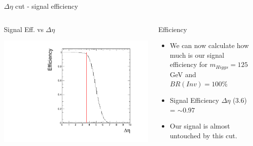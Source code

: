 \documentclass[8pt]{beamer}
\begin{document}
\begin{frame}{$\Delta\eta$ cut - signal efficiency}
 
\begin{columns}
 
\begin{block}{Signal Eff. vs $\Delta\eta$}

\includegraphics[width=\linewidth]{img/NoCut/DEtaEff.pdf} 

\end{block}

\begin{block}{Efficiency}

\begin{itemize}
  \item We can now calculate how much is our signal efficiency for $m_{Higgs}=125$ GeV and $BR(Inv)=100\%$ 
  \item Signal Efficiency $\Delta\eta$ (3.6) = $\sim0.97$
  \item Our signal is almost untouched by this cut.
\end{itemize}

\end{block}

\end{columns}

\end{frame}
\end{document}
